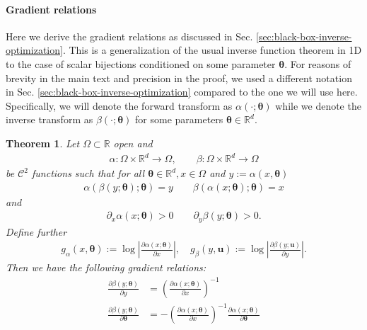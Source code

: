 \documentclass{article}
\newtheorem{theorem}{Theorem}
\begin{document}
\paragraph{Gradient relations}
Here we derive the gradient relations as discussed in Sec. \ref{sec:black-box-inverse-optimization}. This is a generalization of the usual inverse function theorem in 1D to the case of scalar bijections conditioned on some parameter $\bm \theta$. For reasons of brevity in the main text and precision in the proof, we used a different notation in Sec. \ref{sec:black-box-inverse-optimization} compared to the one we will use here. Specifically, we will denote the forward transform as $\alpha(\cdot; \bm \theta)$ while we denote the inverse transform as $\beta(\cdot; \bm \theta)$ for some parameters $\bm \theta \in \mathbb{R}^{d}$.
\begin{theorem}
\label{thm:backward-gradients}
Let $\Omega \subset \mathbb{R}$ open and
\begin{align*}
    \alpha \colon \Omega \times \mathbb{R}^{d} \rightarrow \Omega, \qquad
    \beta \colon \Omega \times \mathbb{R}^{d} \rightarrow \Omega
\end{align*}
be $\mathcal{C}^{2}$ functions such that for all $\bm \theta \in \mathbb{R}^{d}, x \in \Omega$  and $y := \alpha(x, \bm \theta)$
\begin{align} 
    \alpha(\beta(y; \bm \theta); \bm \theta) = y \qquad
    \beta(\alpha(x; \bm \theta); \bm \theta) = x \label{eq:local-inverse-rule}
\end{align}
and 
\begin{align}
    \partial_{x} \alpha(x; \bm \theta) > 0 \qquad 
    \partial_{y} \beta(y; \bm \theta) > 0. \label{eq:monotonicity-of-forward-and-inverse-function}
\end{align}
Define further
\begin{align}
    g_{\alpha}(x,\bm \theta) := \log \left| \frac{\partial \alpha(x; \bm \theta) }{\partial x } \right|, \quad g_{\beta}(y,\bm u) := \log \left| \frac{\partial \beta(y; \bm u) }{\partial y } \right|.
\end{align}
Then we have the following gradient relations:
\begin{align}
    \frac{\partial \beta(y; \bm \theta)}{\partial y} &= \left(\frac{\partial \alpha(x; \bm \theta)}{\partial x}\right)^{-1} \label{eq:grad-out-in} \\
    \frac{\partial \beta(y; \bm \theta)}{\partial \bm \theta} &= - \left(\frac{\partial \alpha(x; \bm \theta)}{\partial x}\right)^{-1} \frac{\partial \alpha(x; \bm \theta)}{\partial \bm \theta} \label{eq:grad-out-param} \\

\end{align}
\end{theorem}
\end{document}
